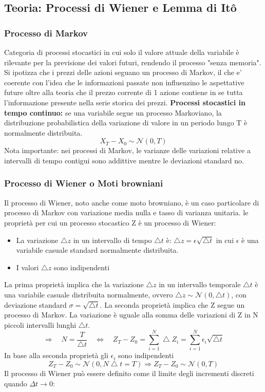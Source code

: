 \documentclass[12pt,a4paper]{report}
\begin{document}
\subsection{Teoria: Processi di Wiener e Lemma di Itô}
\subsubsection{Processo di Markov}
Categoria di processi stocastici in cui solo il valore attuale della variabile è rilevante per la previsione dei valori futuri, rendendo il processo "senza memoria".
Si ipotizza che i prezzi delle azioni seguano un processo di Markov, il che e' coerente con l'idea che le informazioni passate non influenzino le aspettative future oltre alla teoria che il prezzo corrente di 1 azione contiene in se tutta l'informazione presente nella serie storica dei prezzi.
\newline
\textbf{Processi stocastici in tempo continuo:} se una variabile segue un processo Markoviano, la distribuzione probabilistica della variazione di valore in un periodo lungo T è normalmente distribuita.
\[
X_T - X_0 \sim \mathcal{N} (0, T)
\]
Nota importante: nei processi di Markov, le varianze delle variazioni relative a intervalli di tempo contigui sono addittive mentre le deviazioni standard no.
\subsubsection{Processo di Wiener o Moti browniani}
Il processo di Wiener, noto anche come moto browniano, è un caso particolare di processo di Markov con variazione media nulla e tasso di varianza unitaria.
 le proprietà per cui un processo stocastico Z è un processo di Wiener:
\begin{itemize}
    \item La variazione \(\bigtriangleup z\) in un intervallo di tempo \(\bigtriangleup t\) è: \(\bigtriangleup z = \epsilon \sqrt{\bigtriangleup t}\)
    in cui \(\epsilon\) è una variabile casuale standard normalmente distribuita.
    \item I valori \(\bigtriangleup z\) sono indipendenti
\end{itemize}
La prima proprietà implica che la variazione \(\bigtriangleup z\) in un intervallo temporale \(\bigtriangleup t\) è una variabile casuale distribuita normalmente, ovvero \(\bigtriangleup z \sim \mathcal{N}(0, \bigtriangleup t)\), con deviazione standard \(\sigma = \sqrt{\bigtriangleup t}\).
\newline
La seconda proprietà implica che Z segue un processo di Markov.
La variazione è uguale alla somma delle variazioni di Z in N piccoli intervalli lunghi \(\bigtriangleup t\).
\[
\Longrightarrow \quad N = \frac{T}{\bigtriangleup t} \quad \Longleftrightarrow \quad Z_T - Z_0 = \sum_{i=1}^{N} \bigtriangleup Z_i = \sum_{i=1}^{N} \epsilon_i \sqrt{\bigtriangleup t}
\]
In base alla seconda proprietà gli \(\epsilon_i\) sono indipendenti
\[
Z_T - Z_0 \sim \mathcal{N}(0, N \bigtriangleup t = T) \Longrightarrow Z_T - Z_0 \sim \mathcal{N}(0, T)
\]
Il processo di Wiener può essere definito come il limite degli incrementi discreti quando \(\Delta t \to 0\):
\end{document}
